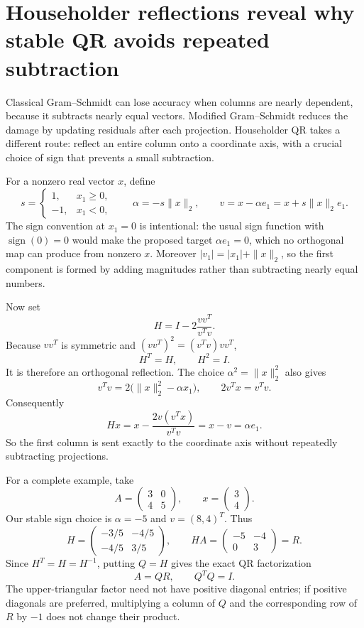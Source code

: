 \section{Householder reflections reveal why stable QR avoids repeated subtraction}

Classical Gram--Schmidt can lose accuracy when columns are nearly dependent, because it subtracts nearly equal vectors. Modified Gram--Schmidt reduces the damage by updating residuals after each projection. Householder QR takes a different route: reflect an entire column onto a coordinate axis, with a crucial choice of sign that prevents a small subtraction.

For a nonzero real vector \(x\), define
\[
 s=\begin{cases}1,&x_1\ge0,\\-1,&x_1<0,\end{cases}
 \qquad
 \alpha=-s\|x\|_2,
 \qquad v=x-\alpha e_1=x+s\|x\|_2e_1.
\]
The sign convention at \(x_1=0\) is intentional: the usual sign function with \(\operatorname{sign}(0)=0\) would make the proposed target \(\alpha e_1=0\), which no orthogonal map can produce from nonzero \(x\). Moreover \(|v_1|=|x_1|+\|x\|_2\), so the first component is formed by adding magnitudes rather than subtracting nearly equal numbers.

Now set
\[
 \boxed{H=I-2\frac{vv^T}{v^Tv}.}
\]
Because \(vv^T\) is symmetric and \((vv^T)^2=(v^Tv)vv^T\),
\[
 H^T=H,\qquad H^2=I.
\]
It is therefore an orthogonal reflection. The choice \(\alpha^2=\|x\|_2^2\) also gives
\[
 v^Tv=2\bigl(\|x\|_2^2-\alpha x_1\bigr),
 \qquad
 2v^Tx=v^Tv.
\]
Consequently
\[
 Hx=x-\frac{2v(v^Tx)}{v^Tv}=x-v
     =\boxed{\alpha e_1}.
\]
So the first column is sent exactly to the coordinate axis without repeatedly subtracting projections.

For a complete example, take
\[
 A=\begin{pmatrix}3&0\\4&5\end{pmatrix},\qquad
 x=\begin{pmatrix}3\\4\end{pmatrix}.
\]
Our stable sign choice is \(\alpha=-5\) and \(v=(8,4)^T\). Thus
\[
 H=
 \begin{pmatrix}-3/5&-4/5\\-4/5&3/5\end{pmatrix},
 \qquad
 HA=
 \begin{pmatrix}-5&-4\\0&3\end{pmatrix}=R.
\]
Since \(H^T=H=H^{-1}\), putting \(Q=H\) gives the exact QR factorization
\[
 \boxed{A=QR,\qquad Q^TQ=I.}
\]
The upper-triangular factor need not have positive diagonal entries; if positive diagonals are preferred, multiplying a column of \(Q\) and the corresponding row of \(R\) by \(-1\) does not change their product.

